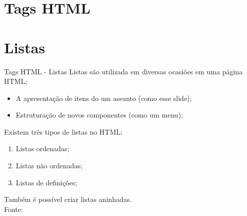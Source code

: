 \documentclass{beamer}
\begin{document}
\section{Tags HTML}
\section{Listas}
\begin{frame}{Tags HTML - Listas}
  Listas são utilizada em diversas ocasiões em uma página HTML;
  \begin{itemize}
   \item A apresentação de itens do um assunto (como esse slide);
   \item Estruturação de novos componentes (como um menu);
  \end{itemize}
   Existem três tipos de listas no HTML:
  \begin{enumerate}
   \item Listas ordenadas;
    \item Listas não ordenadas;
    \item Listas de definições;
 \end{enumerate}
 Também é possível criar listas aninhadas.\\
 \tiny{Fonte: \cite{miletto2014desenvolvimento}}
\end{frame}
\end{document}
